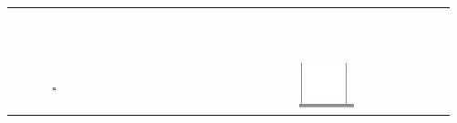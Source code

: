 \documentclass[10pt]{article}
\begin{document}
\begin{center}
\begin{tabular}{|c|c|c|c|c|c|c|c|c|c|c|c|c|c|c|c|c|c|c|c|c|c|c|c|c|c|c|c|c|c|}
\hline
 &  &  &  &  &  &  &  &  &  &  &  &  &  &  &  &  &  &  &  &  &  &  &  &  &  &  &  &  &  \\
\hline
 &  &  &  &  &  &  &  &  &  &  &  &  &  &  &  &  &  &  &  &  &  &  &  &  &  &  &  &  &  \\
\hline
 &  &  &  &  &  &  &  &  &  &  &  &  &  &  &  &  &  &  &  &  &  &  &  &  &  &  &  &  &  \\
\hline
 &  &  &  &  &  &  &  &  &  &  &  &  &  &  &  &  &  &  &  &  &  &  &  &  &  &  &  &  &  \\
\hline
 &  &  &  &  &  &  &  &  &  &  &  &  &  &  &  &  &  &  &  &  &  &  &  &  &  &  &  &  &  \\
\hline
 &  &  &  &  &  &  &  &  &  &  &  &  &  &  &  &  &  &  &  &  &  &  &  &  &  &  &  &  &  \\
\hline
 &  &  &  &  &  &  &  &  &  &  &  &  &  &  &  &  &  &  &  &  &  &  &  &  &  &  &  &  &  \\
\hline
 &  &  &  &  &  &  &  &  &  &  &  &  &  &  &  &  &  &  &  &  &  &  &  &  &  &  &  &  &  \\
\hline
 &  &  &  &  &  &  &  &  &  &  &  &  &  &  &  &  &  &  &  &  &  &  &  &  &  &  &  &  &  \\
\hline
 &  &  &  &  &  &  &  &  &  &  &  &  &  &  &  &  &  &  &  &  &  &  &  &  &  &  &  &  &  \\
\hline
 &  &  &  &  &  &  &  &  &  &  &  &  &  &  &  &  &  &  &  &  &  &  &  &  &  &  &  &  &  \\
\hline
 &  &  &  &  &  &  &  &  &  &  &  &  &  &  &  &  &  &  &  &  &  &  &  &  &  &  &  &  &  \\
\hline
 &  &  & \(\square\) &  &  &  &  &  &  &  &  &  &  &  &  &  &  &  &  &  &  & \includegraphics[max width=\textwidth]{2024_11_21_d15133c79177ee6989d3g-04(1)}

\end{tabular}
\end{center}
\end{document}
